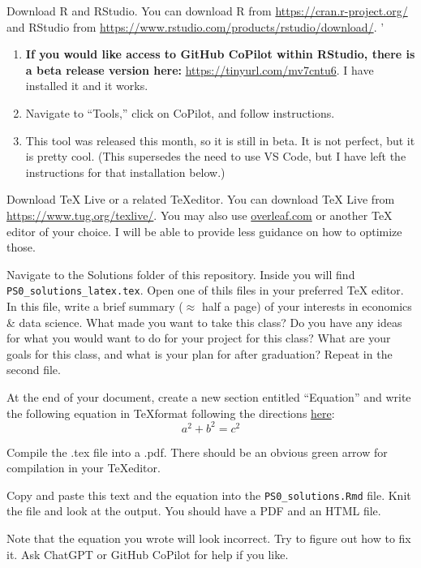 \documentclass[12pt,english]{exam}
\begin{document}
\begin{questions}
\question Download R and RStudio. You can download R from \url{https://cran.r-project.org/} and RStudio from \url{https://www.rstudio.com/products/rstudio/download/}. '

\begin{enumerate}
  \item \textbf{If you would like access to GitHub CoPilot within RStudio, there is a beta release version here:} \url{https://tinyurl.com/mv7cntu6}. I have installed it and it works. 
  \item Navigate to ``Tools,'' click on CoPilot, and follow instructions. 
  \item This tool was released this month, so it is still in beta. It is not perfect, but it is pretty cool. (This supersedes the need to use VS Code, but I have left the instructions for that installation below.)
\end{enumerate}

\question Download TeX Live or a related \TeX editor. You can download TeX Live from \url{https://www.tug.org/texlive/}. You may also use \url{overleaf.com} or another TeX editor of your choice. I will be able to provide less guidance on how to optimize those.

\question Navigate to the Solutions folder of this repository. Inside you will find \texttt{PS0\_solutions\_latex.tex}. Open one of thils files in your preferred TeX editor. In this file, write a brief summary ($\approx$ half a page) of your interests in economics \& data science. What made you want to take this class? Do you have any ideas for what you would want to do for your project for this class? What are your goals for this class, and what is your plan for after graduation? Repeat in the second file. 

\question At the end of your document, create a new section entitled ``Equation'' and write the following equation in \TeX format following the directions \href{https://www.overleaf.com/learn/latex/mathematical_expressions}{here}:
\begin{equation}
	a^{2} + b^{2} = c^{2}
\end{equation}

\question Compile the .tex file into a .pdf. There should be an obvious green arrow for compilation in your \TeX editor. 

Copy and paste this text and the equation into the \texttt{PS0\_solutions.Rmd} file. Knit the file and look at the output. You should have a PDF and an HTML file.

Note that the equation you wrote will look incorrect. Try to figure out how to fix it. Ask ChatGPT or GitHub CoPilot for help if you like. 


\end{questions}
\end{document}
